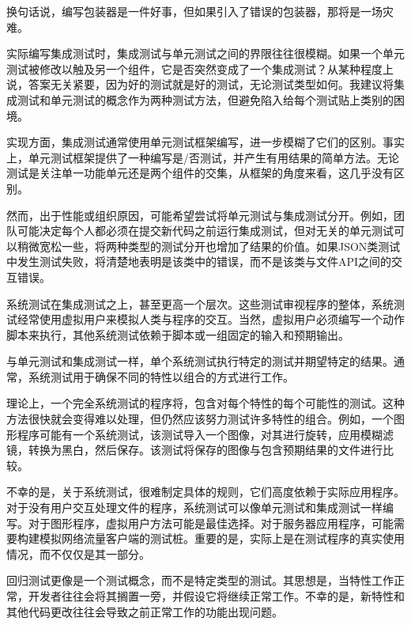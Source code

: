 换句话说，编写包装器是一件好事，但如果引入了错误的包装器，那将是一场灾难。


实际编写集成测试时，集成测试与单元测试之间的界限往往很模糊。如果一个单元测试被修改以触及另一个组件，它是否突然变成了一个集成测试？从某种程度上说，答案无关紧要，因为好的测试就是好的测试，无论测试类型如何。我建议将集成测试和单元测试的概念作为两种测试方法，但避免陷入给每个测试贴上类别的困境。

实现方面，集成测试通常使用单元测试框架编写，进一步模糊了它们的区别。事实上，单元测试框架提供了一种编写是/否测试，并产生有用结果的简单方法。无论测试是关注单一功能单元还是两个组件的交集，从框架的角度来看，这几乎没有区别。

然而，出于性能或组织原因，可能希望尝试将单元测试与集成测试分开。例如，团队可能决定每个人都必须在提交新代码之前运行集成测试，但对无关的单元测试可以稍微宽松一些，将两种类型的测试分开也增加了结果的价值。如果JSON类测试中发生测试失败，将清楚地表明是该类中的错误，而不是该类与文件API之间的交互错误。


系统测试在集成测试之上，甚至更高一个层次。这些测试审视程序的整体，系统测试经常使用虚拟用户来模拟人类与程序的交互。当然，虚拟用户必须编写一个动作脚本来执行，其他系统测试依赖于脚本或一组固定的输入和预期输出。

与单元测试和集成测试一样，单个系统测试执行特定的测试并期望特定的结果。通常，系统测试用于确保不同的特性以组合的方式进行工作。

理论上，一个完全系统测试的程序将，包含对每个特性的每个可能性的测试。这种方法很快就会变得难以处理，但仍然应该努力测试许多特性的组合。例如，一个图形程序可能有一个系统测试，该测试导入一个图像，对其进行旋转，应用模糊滤镜，转换为黑白，然后保存。该测试将保存的图像与包含预期结果的文件进行比较。

不幸的是，关于系统测试，很难制定具体的规则，它们高度依赖于实际应用程序。对于没有用户交互处理文件的程序，系统测试可以像单元测试和集成测试一样编写。对于图形程序，虚拟用户方法可能是最佳选择。对于服务器应用程序，可能需要构建模拟网络流量客户端的测试桩。重要的是，实际上是在测试程序的真实使用情况，而不仅仅是其一部分。


回归测试更像是一个测试概念，而不是特定类型的测试。其思想是，当特性工作正常，开发者往往会将其搁置一旁，并假设它将继续正常工作。不幸的是，新特性和其他代码更改往往会导致之前正常工作的功能出现问题。

